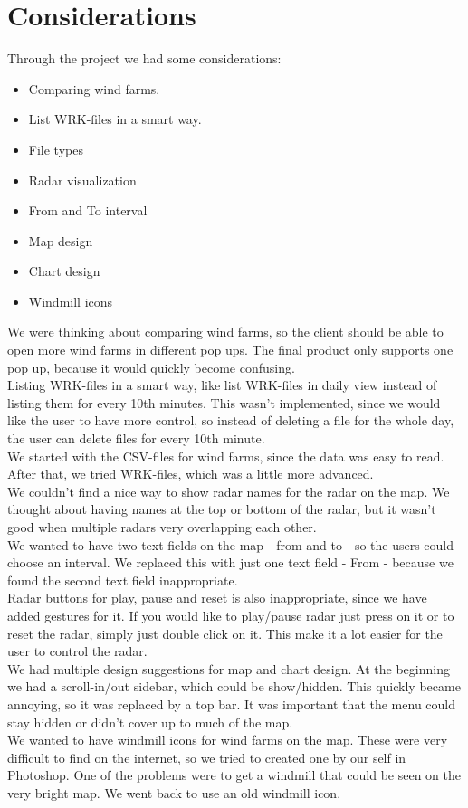 \chapter{Considerations}
Through the project we had some considerations:
\begin{itemize}
\item Comparing wind farms.
\item List WRK-files in a smart way.
\item File types
\item Radar visualization
\item From and To interval
\item Map design
\item Chart design
\item Windmill icons
\end{itemize}
We were thinking about comparing wind farms, so the client should be able to open more wind farms in different pop ups. The final product only supports one pop up, because it would quickly become confusing.\\
Listing WRK-files in a smart way, like list WRK-files in daily view instead of listing them for every 10th minutes. This wasn't implemented, since we would like the user to have more control, so instead of deleting a file for the whole day, the user can delete files for every 10th minute.\\
We started with the CSV-files for wind farms, since the data was easy to read. After that, we tried WRK-files, which was a little more advanced.\\
We couldn't find a nice way to show radar names for the radar on the map. We thought about having names at the top or bottom of the radar, but it wasn't good when multiple radars very overlapping each other.\\
We wanted to have two text fields on the map - from and to - so the users could choose an interval. We replaced this with just one text field - From - because we found the second text field inappropriate.\\
Radar buttons for play, pause and reset is also inappropriate, since we have added gestures for it. If you would like to play/pause radar just press on it or to reset the radar, simply just double click on it. This make it a lot easier for the user to control the radar.\\
We had multiple design suggestions for map and chart design. At the beginning we had a scroll-in/out sidebar, which could be show/hidden. This quickly became annoying, so it was replaced by a top bar. It was important that the menu could stay hidden or didn't cover up to much of the map.\\
We wanted to have windmill icons for wind farms on the map. These were very difficult to find on the internet, so we tried to created one by our self in Photoshop. One of the problems were to get a windmill that could be seen on the very bright map. We went back to use an old windmill icon.\\
